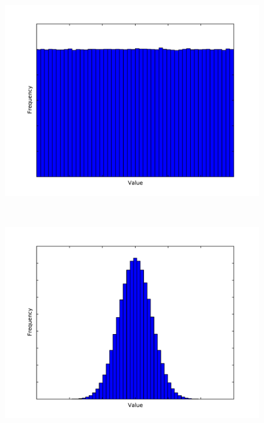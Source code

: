 \begin{figure}
	\begin{center}
		\begin{subfloat}{%
			\includegraphics[scale=0.2]{figures/freqdist_uniform.pdf}
		}
		\end{subfloat}~
		\begin{subfloat}{%
			\includegraphics[scale=0.2]{figures/freqdist_gaussian.pdf}
		}
		\end{subfloat}~

\end{center}
\end{figure}
